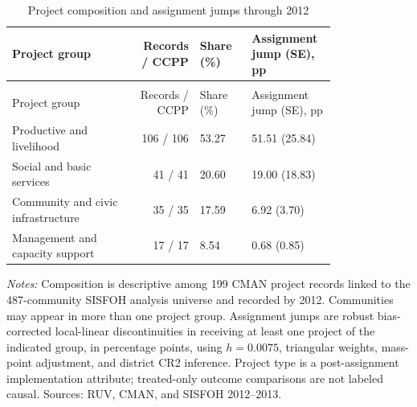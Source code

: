 \begingroup\fontsize{9.25}{11.4}\selectfont
\setlength{\tabcolsep}{3pt}\renewcommand{\arraystretch}{1.18}
\begin{longtable}{@{}>{\raggedright\arraybackslash}p{0.38\linewidth}rp{0.16\linewidth}p{0.26\linewidth}@{}}
\caption{Project composition and assignment jumps through 2012}\label{tab:pub_A04} \\
\toprule Project group & Records / CCPP & Share (\%) & Assignment jump (SE), pp \\ \midrule\endfirsthead
\multicolumn{4}{c}{\tablename\ \thetable{} -- continued} \\
\toprule Project group & Records / CCPP & Share (\%) & Assignment jump (SE), pp \\ \midrule\endhead
Productive and livelihood & 106 / 106 & 53.27 & 51.51 (25.84) \\
Social and basic services & 41 / 41 & 20.60 & 19.00 (18.83) \\
Community and civic infrastructure & 35 / 35 & 17.59 & 6.92 (3.70) \\
Management and capacity support & 17 / 17 & 8.54 & 0.68 (0.85) \\
\bottomrule\end{longtable}
\parbox{0.97\linewidth}{\footnotesize \textit{Notes:} Composition is descriptive among 199 CMAN project records linked to the 487-community SISFOH analysis universe and recorded by 2012. Communities may appear in more than one project group. Assignment jumps are robust bias-corrected local-linear discontinuities in receiving at least one project of the indicated group, in percentage points, using \(h=0.0075\), triangular weights, mass-point adjustment, and district CR2 inference. Project type is a post-assignment implementation attribute; treated-only outcome comparisons are not labeled causal. Sources: RUV, CMAN, and SISFOH 2012--2013.}
\par{}\par\endgroup
